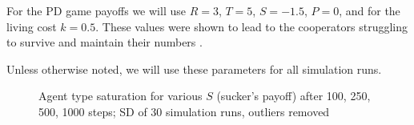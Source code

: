 \documentclass[english]{article}
\begin{document}
For the PD game payoffs we will use $R = 3$, $T = 5$, $S = -1.5$, $P = 0$,
and for the living cost $k = 0.5$.
These values were shown to lead to the cooperators struggling to survive
and maintain their numbers \citep{smaldino}.

Unless otherwise noted, we will use these parameters for all simulation runs.

\begin{figure}[!ht]
  \centering
  \caption{Agent type saturation for various $S$ (sucker's payoff) after 100, 250, 500, 1000 steps; SD of 30 simulation runs, outliers removed}
  \label{fig:agent_sat/S-memory0gossip0}
\end{figure}
\end{document}
